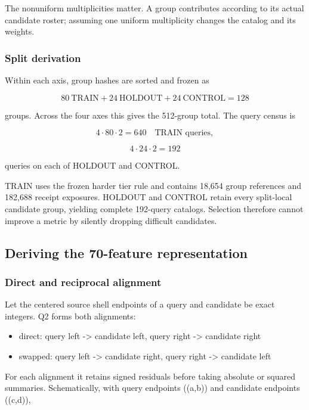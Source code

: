 The nonuniform multiplicities matter. A group contributes according to
its actual candidate roster; assuming one uniform multiplicity changes
the catalog and its weights.

\subsubsection{Split derivation}\label{viii-ch07-split-derivation}

Within each axis, group hashes are sorted and frozen as

\[
80\ \text{TRAIN}+24\ \text{HOLDOUT}+24\ \text{CONTROL}=128
\]

groups. Across the four axes this gives the 512-group total. The query
census is

\[
4\cdot80\cdot2=640\quad\text{TRAIN queries},
\]

\[
4\cdot24\cdot2=192
\]

queries on each of HOLDOUT and CONTROL.

TRAIN uses the frozen harder tier rule and contains 18,654 group
references and 182,688 receipt exposures. HOLDOUT and CONTROL retain
every split-local candidate group, yielding complete 192-query catalogs.
Selection therefore cannot improve a metric by silently dropping
difficult candidates.

\subsection{Deriving the 70-feature
representation}\label{viii-ch07-deriving-the-70-feature-representation}

\subsubsection{Direct and reciprocal
alignment}\label{viii-ch07-direct-and-reciprocal-alignment}

Let the centered source shell endpoints of a query and candidate be
exact integers. Q2 forms both alignments:

\begin{itemize}
\tightlist
\item
  direct: query left -\textgreater{} candidate left, query right
  -\textgreater{} candidate right
\item
  swapped: query left -\textgreater{} candidate right, query right
  -\textgreater{} candidate left
\end{itemize}

For each alignment it retains signed residuals before taking absolute or
squared summaries. Schematically, with query endpoints ((a,b)) and
candidate endpoints ((c,d)),


